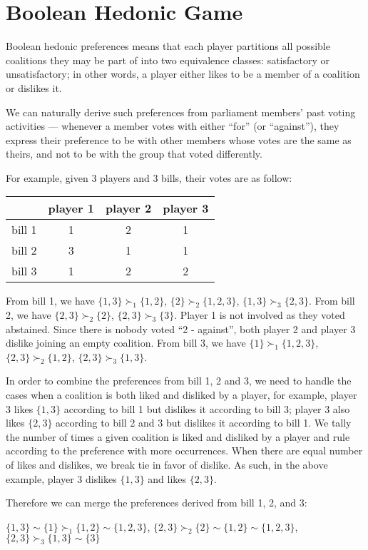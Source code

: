 \section{Boolean Hedonic Game}

Boolean hedonic preferences means that each player partitions all possible
coalitions they may be part of into two equivalence classes:
satisfactory or unsatisfactory; in other words, a player either likes to be
a member of a coalition or dislikes it.

We can naturally derive such preferences from parliament members' past voting
activities --- whenever a member votes with either ``for'' (or ``against''), they
express their preference to be with other members whose votes are the same
as theirs, and not to be with the group that voted differently.

For example, given 3 players and 3 bills, their votes are as follow:

\begin{table}[h!]
\centering
\begin{tabular}{|c|c|c|c|}
\hline
       & player 1 & player 2 & player 3 \\ \hline
bill 1 & 1 & 2 & 1 \\
bill 2 & 3 & 1 & 1 \\
bill 3 & 1 & 2 & 2 \\
\hline
\end{tabular}
\end{table}

From bill 1, we have $\{1, 3\} \succ_1 \{1, 2\}$, $\{2\} \succ_2 \{1, 2, 3\}$,
$\{1, 3\} \succ_3 \{2, 3\}$.
From bill 2, we have $\{2, 3\} \succ_2 \{2\}$, $\{2, 3\} \succ_3 \{3\}$.
Player 1 is not involved as they voted abstained.
Since there is nobody voted ``2 - against'', both player 2 and player 3 dislike
joining an empty coalition.
From bill 3, we have $\{1\} \succ_1 \{1, 2, 3\}$, $\{2, 3\} \succ_2 \{1, 2\}$,
$\{2, 3\} \succ_3 \{1, 3\}$.

In order to combine the preferences from bill 1, 2 and 3, we need to handle
the cases when a coalition is both liked and disliked by a player, for example,
player 3 likes $\{1, 3\}$ according to bill 1 but dislikes it according to bill 3;
player 3 also likes $\{2, 3\}$ according to bill 2 and 3 but dislikes it according to bill 1.
We tally the number of times a given coalition is liked and disliked by a player and
rule according to the preference with more occurrences. When there are equal number of
likes and dislikes, we break tie in favor of dislike.
As such, in the above example, player 3 dislikes $\{1, 3\}$ and likes $\{2, 3\}$.

Therefore we can merge the preferences derived from bill 1, 2, and 3:

$\{1, 3\} \sim \{1\} \succ_1 \{1, 2\} \sim \{1, 2, 3\}$,
$\{2, 3\} \succ_2 \{2\} \sim \{1, 2\} \sim \{1, 2, 3\}$,
$\{2, 3\} \succ_3 \{1, 3\} \sim \{3\}$

